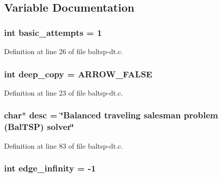 \subsection{Variable Documentation}
\hypertarget{bin_2baltsp-dt_8c_227b7ec968925f365b96a92ace419c56}{
\subsubsection[{basic\_\-attempts}]{\setlength{\rightskip}{0pt plus 5cm}int {\bf basic\_\-attempts} = 1}}
\label{bin_2baltsp-dt_8c_227b7ec968925f365b96a92ace419c56}




Definition at line 26 of file baltsp-dt.c.\hypertarget{bin_2baltsp-dt_8c_7298da576a5b127d04b4c46b3bc78821}{
\subsubsection[{deep\_\-copy}]{\setlength{\rightskip}{0pt plus 5cm}int {\bf deep\_\-copy} = ARROW\_\-FALSE}}
\label{bin_2baltsp-dt_8c_7298da576a5b127d04b4c46b3bc78821}




Definition at line 23 of file baltsp-dt.c.\hypertarget{bin_2baltsp-dt_8c_3aad16fd4bea1b9717f232ea75ad6449}{
\subsubsection[{desc}]{\setlength{\rightskip}{0pt plus 5cm}char$\ast$ {\bf desc} = \char`\"{}Balanced traveling salesman problem (BalTSP) solver\char`\"{}}}
\label{bin_2baltsp-dt_8c_3aad16fd4bea1b9717f232ea75ad6449}




Definition at line 83 of file baltsp-dt.c.\hypertarget{bin_2baltsp-dt_8c_61a12d5995172f376610cce2f19e5855}{
\subsubsection[{edge\_\-infinity}]{\setlength{\rightskip}{0pt plus 5cm}int {\bf edge\_\-infinity} = -1}}
\label{bin_2baltsp-dt_8c_61a12d5995172f376610cce2f19e5855}




